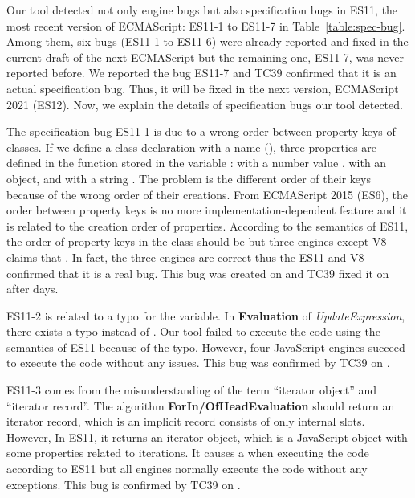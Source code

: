 Our tool detected not only engine bugs but also  specification bugs in
ES11, the most recent version of ECMAScript: ES11-1 to ES11-7 in
Table~\ref{table:spec-bug}.  Among them, six bugs (ES11-1 to ES11-6) were
already reported and fixed in the current draft of the next ECMAScript but the
remaining one, ES11-7, was never reported before.  We reported the bug ES11-7
and TC39 confirmed that it is an actual specification bug.  Thus, it will be
fixed in the next version, ECMAScript 2021 (ES12).  Now, we explain the details
of specification bugs our tool detected.

The specification bug ES11-1 is due to a wrong order between property keys of
classes.  If we define a class declaration with a name  (),
three properties are defined in the function stored in the variable :
 with a number value ,  with an object, and
 with a string .  The problem is the different order of
their keys because of the wrong order of their creations.  From ECMAScript 2015
(ES6), the order between property keys is no more implementation-dependent
feature and it is related to the creation order of properties.  According
to the semantics of ES11, the order of property keys in the class 
should be  but three engines except V8
claims that .  In fact, the three engines
are correct thus the ES11 and V8 confirmed that it is a real bug.  This bug was
created on \inred{-} and TC39 fixed it on \inred{-} after \inred{-} days.

ES11-2 is related to a typo for the variable.  In \textbf{Evaluation} of
\textit{UpdateExpression}, there exists a typo  instead of
.  Our tool failed to execute the code  using the
semantics of ES11 because of the typo.  However, four JavaScript engines succeed
to execute the code without any issues.  This bug was confirmed by TC39 on
\inred{-}.

ES11-3 comes from the misunderstanding of the term ``iterator object'' and
``iterator record''.  The algorithm \textbf{ForIn/OfHeadEvaluation} should
return an iterator record, which is an implicit record consists of only internal
slots.  However, In ES11, it returns an iterator object, which is a JavaScript
object with some properties related to iterations.  It causes a 
when executing the code  according to ES11 but all
engines normally execute the code without any exceptions.  This bug is confirmed
by TC39 on \inred{-}.

